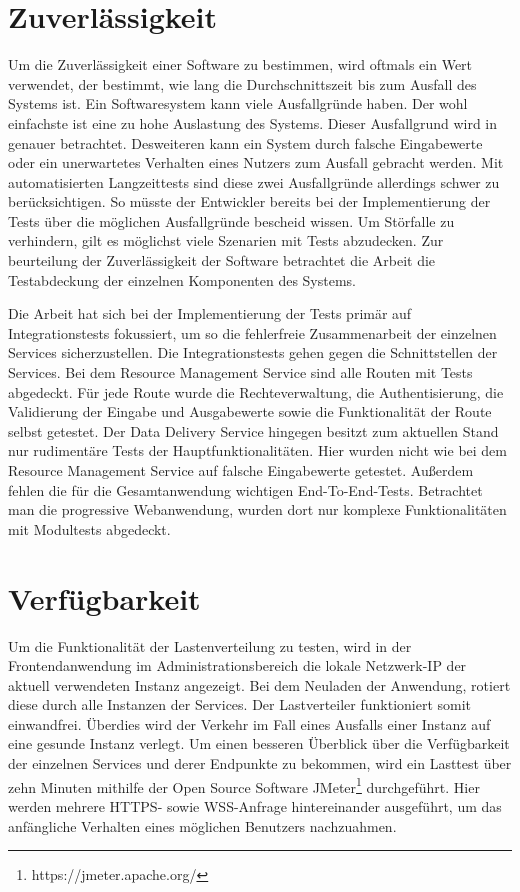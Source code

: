 \section{Zuverlässigkeit}
\label{sec:zuverlaessigkeit}
Um die Zuverlässigkeit einer Software zu bestimmen, wird oftmals ein Wert verwendet,
der bestimmt, wie lang die Durchschnittszeit bis zum Ausfall des Systems ist.\cite[S. 9]{SoftwareQualitaet}
Ein Softwaresystem kann viele Ausfallgründe haben. Der wohl einfachste ist eine zu hohe Auslastung des Systems.
Dieser Ausfallgrund wird in  genauer betrachtet. Desweiteren kann ein System durch falsche
Eingabewerte oder ein unerwartetes Verhalten eines Nutzers zum Ausfall gebracht werden. Mit automatisierten Langzeittests
sind diese zwei Ausfallgründe allerdings schwer zu berücksichtigen. So müsste der Entwickler bereits bei der Implementierung
der Tests über die möglichen Ausfallgründe bescheid wissen. Um Störfalle zu verhindern, gilt es möglichst viele Szenarien mit
Tests abzudecken. Zur beurteilung der Zuverlässigkeit der Software betrachtet die Arbeit die Testabdeckung der einzelnen Komponenten
des Systems.

Die Arbeit hat sich bei der Implementierung der Tests primär auf Integrationstests fokussiert, um so die fehlerfreie 
Zusammenarbeit der einzelnen Services sicherzustellen. Die Integrationstests gehen gegen die Schnittstellen der Services.
Bei dem Resource Management Service sind alle Routen mit Tests abgedeckt. Für jede Route wurde die Rechteverwaltung,
die Authentisierung, die Validierung der Eingabe und Ausgabewerte sowie die Funktionalität der Route selbst getestet.
Der Data Delivery Service hingegen besitzt zum aktuellen Stand nur rudimentäre Tests der Hauptfunktionalitäten.
Hier wurden nicht wie bei dem Resource Management Service auf falsche Eingabewerte getestet. Außerdem fehlen die für
die Gesamtanwendung wichtigen End-To-End-Tests. Betrachtet man die progressive Webanwendung, wurden dort nur komplexe
Funktionalitäten mit Modultests abgedeckt.

\section{Verfügbarkeit}
\label{sec:verfuegbarkeit}
Um die Funktionalität der Lastenverteilung zu testen, wird in der Frontendanwendung
im Administrationsbereich die lokale Netzwerk-IP der aktuell verwendeten Instanz
angezeigt. Bei dem Neuladen der Anwendung, rotiert diese
durch alle Instanzen der Services. Der Lastverteiler funktioniert somit einwandfrei.
Überdies wird der Verkehr im Fall eines Ausfalls einer Instanz auf eine gesunde
Instanz verlegt. Um einen besseren Überblick über die Verfügbarkeit der einzelnen
Services und derer Endpunkte zu bekommen, wird ein Lasttest über zehn Minuten mithilfe der Open Source Software
JMeter\footnote{https://jmeter.apache.org/} durchgeführt. Hier werden mehrere HTTPS- sowie
WSS-Anfrage hintereinander ausgeführt, um das anfängliche Verhalten eines möglichen Benutzers nachzuahmen.

